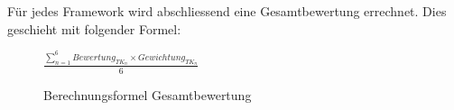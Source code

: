 Für jedes Framework wird abschliessend eine Gesamtbewertung errechnet. Dies geschieht mit folgender Formel:

\begin{figure}[H]
	\centering
	\large
	\begin{math}
		\frac{\sum \limits_{n=1}^6 Bewertung_{TK_n} \times {Gewichtung_{TK_n}}}{6}
	\end{math}
	\caption{Berechnungsformel Gesamtbewertung}
\end{figure}


\newpage






